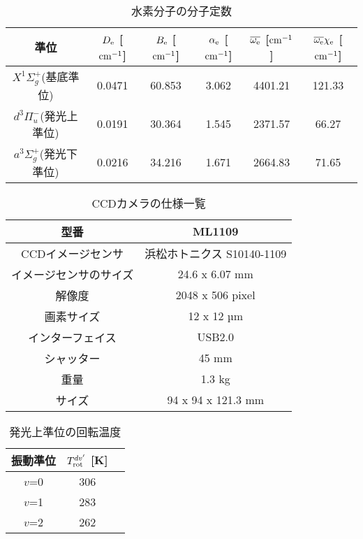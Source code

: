 \listoftables
{}

\begin{table}
    \caption{水素分子の分子定数\cite{nist}}
    \label{table:molecular-constants}
    \centering
    \begin{tabular}{cccccc}
        \hline
        準位 & $D_{\rm e}$ [$\rm cm^{-1}$]& $B_{\rm e}$ [$\rm cm^{-1}$]& $\alpha_{\rm e}$ [$\rm cm^{-1}$]& $\overline{\omega_{\rm e}}$ [$\rm cm^{-1}$]& $\overline{\omega_{\rm e}} \chi_{\rm e}$ [$\rm cm^{-1}$]\\
        \hline
        $X^1 \Sigma^+_g$(基底準位) & 0.0471 & 60.853 & 3.062 & 4401.21 & 121.33\\
        $d^3 \Pi^-_u$(発光上準位) & 0.0191 & 30.364 & 1.545 & 2371.57 & 66.27\\
        $a^3 \Sigma^+_g$(発光下準位) & 0.0216 & 34.216 & 1.671 & 2664.83 & 71.65\\
        \hline
    \end{tabular}
\end{table}

\begin{table}
    \caption{CCDカメラの仕様一覧\cite{CCD-spec}}
    \label{table:CCD-spec}
    \centering
    \begin{tabular}{|c|c|}
        \hline
        型番 & ML1109\\
        \hline
        CCDイメージセンサ & 浜松ホトニクス S10140-1109\\
        \hline
        イメージセンサのサイズ &24.6 x 6.07 mm\\
        \hline
        解像度 & 2048 x 506 pixel\\
        \hline
        画素サイズ & 12 x 12 µm\\
        \hline
        インターフェイス & USB2.0\\
        \hline
        シャッター & 45 mm\\
        \hline
        重量 & 1.3 kg\\
        \hline
        サイズ & 94 x 94 x 121.3 mm\\
        \hline
    \end{tabular}
\end{table}

\begin{table}
    \caption{発光上準位の回転温度}
    \label{table:upper-temperatures}
    \centering
    \begin{tabular}{ccc}
        \hline
        振動準位 & $T^{dv'}_{\rm rot}$ [K]\\
        \hline
        $v$=0 & 306\\
        $v$=1 & 283\\
        $v$=2 & 262\\
        \hline
    \end{tabular}
\end{table}


